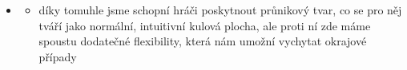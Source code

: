 \begin{itemize}
    \item %
        \begin{itemize}
            \item díky tomuhle jsme schopní hráči poskytnout průnikový tvar, co se pro něj tváří jako normální, intuitivní kulová plocha, ale proti ní zde máme spoustu dodatečné flexibility, která nám umožní vychytat okrajové případy

\end{itemize}
\end{itemize}
